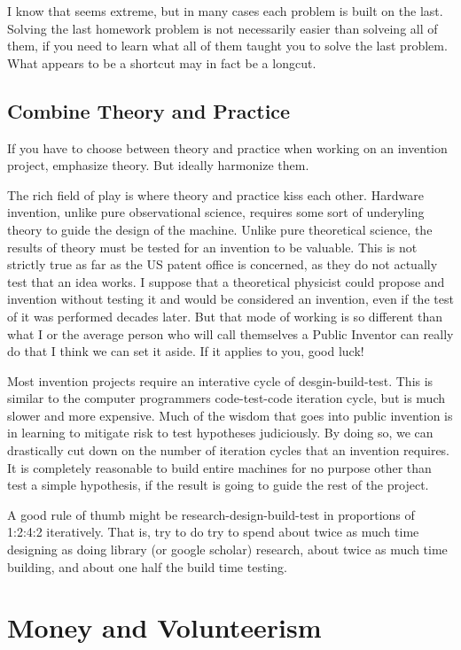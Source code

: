 \documentclass[
	fontsize=10pt, %
	twoside=false, %
	secnumdepth=1, %
]{kaobook}
\begin{document}
I know that seems extreme, but in many cases each problem is built on the last.
Solving the last homework problem is not necessarily easier than solveing all of them,
if you need to learn what all of them taught you to solve the last problem.
What appears to be a shortcut may in fact be a longcut.

\section{Combine Theory and Practice}

If you have to choose between theory and practice when
working on an invention project, emphasize theory.
But ideally harmonize them.

The rich field of play is where theory and practice
kiss each other.
Hardware invention, unlike pure observational science,
requires some sort of underyling theory to guide
the design of the machine.
Unlike pure theoretical science, the results
of theory must be tested for an invention to be valuable.
This is not strictly true as far as the US patent office
is concerned, as they do not actually test that an idea
works.
I suppose that a theoretical physicist could propose and
invention without testing it and would be considered
an invention, even if the test of it was performed decades later.
But that mode of working is so different than what
I or the average person who will call themselves a Public Inventor
can really do that I think we can set it aside. If it applies
to you, good luck!

Most invention projects require an interative cycle of
desgin-build-test.
This is similar to the computer programmers code-test-code iteration
cycle, but is much slower and more expensive.
Much of the wisdom that goes into public invention is in
learning to mitigate risk to test hypotheses judiciously.
By doing so, we can drastically cut down on the number of
iteration cycles that an invention requires.
It is completely reasonable to build entire machines
for no purpose other than test a simple hypothesis, if
the result is going to guide the rest of the project.

A good rule of thumb might be research-design-build-test
in proportions of 1:2:4:2 iteratively. That is, try to do
try to spend about twice as much time designing as doing
library (or google scholar) research, about twice as much
time building, and about one half the build time testing.


\chapter{Money and Volunteerism}
\end{document}

